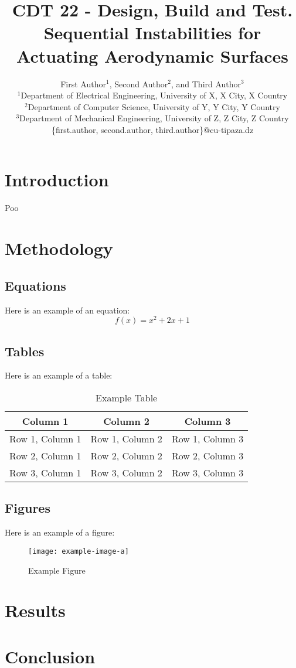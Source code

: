\documentclass{IEEEtran}
\title{CDT 22 - Design, Build and Test. Sequential Instabilities for Actuating Aerodynamic Surfaces}
\author{First Author$^1$, Second Author$^2$, and Third Author$^3$\\
	$^1$Department of Electrical Engineering, University of X, X City, X Country\\
	$^2$Department of Computer Science, University of Y, Y City, Y Country\\
	$^3$Department of Mechanical Engineering, University of Z, Z City, Z Country\\
	\{first.author, second.author, third.author\}@cu-tipaza.dz}
\begin{document}
	\maketitle
	
	\begin{abstract}
		
	\end{abstract}
	
	\section{Introduction}
	Poo \cite{Guest2006}
	
	\section{Methodology}
	
	
	\subsection{Equations}
	Here is an example of an equation:
	\begin{equation}
		f(x) = x^2 + 2x + 1
	\end{equation}
	
	\subsection{Tables}
	Here is an example of a table:
	\begin{table}[htbp]
		\centering
		\caption{Example Table}
		\label{tab:example}
		\begin{tabular}{|c|c|c|}
			\hline
			\textbf{Column 1} & \textbf{Column 2} & \textbf{Column 3} \\
			\hline
			Row 1, Column 1 & Row 1, Column 2 & Row 1, Column 3 \\
			\hline
			Row 2, Column 1 & Row 2, Column 2 & Row 2, Column 3 \\
			\hline
			Row 3, Column 1 & Row 3, Column 2 & Row 3, Column 3 \\
			\hline
		\end{tabular}
	\end{table}
	
	\subsection{Figures}
	Here is an example of a figure:
	\begin{figure}[htbp]
		\centering
		\texttt{[image: example-image-a]}
		\caption{Example Figure}
		\label{fig:example}
	\end{figure}
	
	\section{Results}
	
	\section{Conclusion}
	
	
    \printbibliography
	
\end{document}
